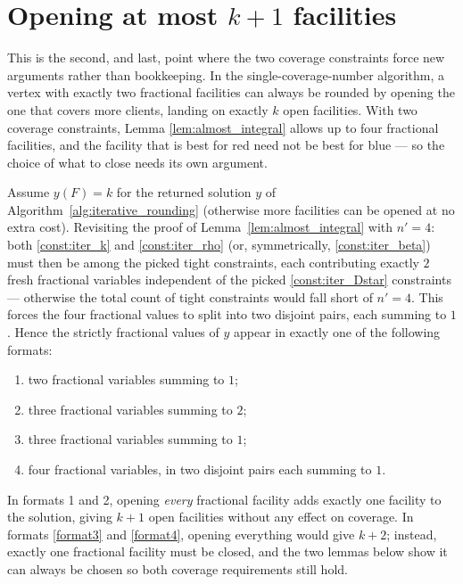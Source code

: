 \documentclass[a4paper,11pt]{article}
\begin{document}
\section{Opening at most $k+1$ facilities}
\label{sec:opening}

This is the second, and last, point where the two coverage constraints
force new arguments rather than bookkeeping. In the single-coverage-number
algorithm, a vertex with exactly two fractional facilities can always be
rounded by opening the one that covers more clients, landing on exactly
$k$ open facilities. With two coverage constraints, Lemma
\ref{lem:almost_integral} allows up to four fractional facilities, and
the facility that is best for red need not be best for blue — so the
choice of what to close needs its own argument.

Assume $y(F)=k$ for the returned solution $y$ of
Algorithm~\ref{alg:iterative_rounding} (otherwise more facilities can be
opened at no extra cost). Revisiting the proof of
Lemma~\ref{lem:almost_integral} with $n'=4$: both
\eqref{const:iter_k} and \eqref{const:iter_rho} (or, symmetrically,
\eqref{const:iter_beta}) must then be among the picked tight constraints,
each contributing exactly $2$ fresh fractional variables independent of
the picked \eqref{const:iter_Dstar} constraints — otherwise the total
count of tight constraints would fall short of $n'=4$. This forces the
four fractional values to split into two disjoint pairs, each summing to
$1$. Hence the strictly fractional values of $y$ appear in exactly one of
the following formats:
\begin{enumerate}
\item two fractional variables summing to $1$;
\item three fractional variables summing to $2$;
\item three fractional variables summing to $1$; \label{format3}
\item four fractional variables, in two disjoint pairs each summing to
$1$. \label{format4}
\end{enumerate}
In formats 1 and 2, opening \emph{every} fractional facility adds exactly
one facility to the solution, giving $k+1$ open facilities without any
effect on coverage. In formats \ref{format3} and \ref{format4}, opening
everything would give $k+2$; instead, exactly one fractional facility
must be closed, and the two lemmas below show it can always be chosen so
both coverage requirements still hold.
\end{document}
